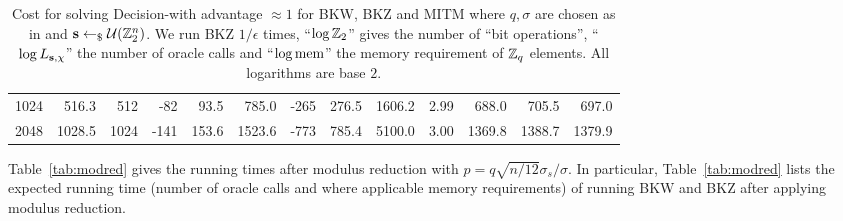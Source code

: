 {\begin{table}
\begin{tabular}{|r||r|r||r|r|r||r|r|r||r|r|r|r|}
1024 &  516.3 &  512 &    -82 &     93.5 &    785.0 &   -265 &    276.5 &   1606.2 &  2.99 &    688.0 &    705.5 &    697.0 \\
2048 & 1028.5 & 1024 &   -141 &    153.6 &   1523.6 &   -773 &    785.4 &   5100.0 &  3.00 &   1369.8 &   1388.7 &   1379.9 \\
\hline
\end{tabular}
\caption{Cost for solving Decision-\LWE with advantage $\approx 1$ for BKW, BKZ and MITM where $q,\sigma$ are chosen as in \cite{regev:acm09} and $\mathbf{s} \leftarrow_{\$} \mathcal{U}(\mathbb{Z}_2^n)$. We run BKZ $1/\epsilon$ times, ``$\log \mathbb{Z}_2$'' gives the number of ``bit operations'', ``$\log L_{\mathbf{s},\chi}$'' the number of \LWE oracle calls 
and ``$\log \textnormal{mem}$'' the memory requirement of $\mathbb{Z}_q$ elements. All logarithms are base $2$.}
\label{tab:nomodred}
\end{table}
Table~\ref{tab:modred} gives the running times after modulus reduction with $p = q\sqrt{n/12}\sigma_s/\sigma$. In particular, Table~\ref{tab:modred} lists the expected running time (number of oracle calls and where applicable memory requirements) of running BKW and BKZ after applying modulus reduction.

}
